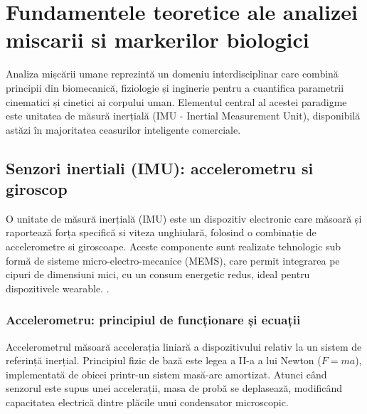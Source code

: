 \chapter{Fundamentele teoretice ale analizei miscarii si markerilor biologici}

\hspace{0.75cm}Analiza mișcării umane reprezintă un domeniu interdisciplinar care combină principii din biomecanică, 
fiziologie și inginerie pentru a cuantifica parametrii cinematici și cinetici ai corpului uman. 
Elementul central al acestei paradigme este unitatea de măsură inerțială (IMU - Inertial Measurement Unit), 
disponibilă astăzi în majoritatea ceasurilor inteligente comerciale.

\section{Senzori inertiali (IMU): accelerometru si giroscop}

\hspace{0.75cm}O unitate de măsură inerțială (IMU) este un dispozitiv electronic care măsoară și raportează forța specifică si viteza unghiulară, folosind o 
combinație de accelerometre si giroscoape. Aceste componente sunt realizate tehnologic sub formă de sisteme micro-electro-mecanice (MEMS), 
care permit integrarea pe cipuri de dimensiuni mici, 
cu un consum energetic redus, ideal pentru dispozitivele wearable. \cite{woodman_2007}.

\subsection{Accelerometru: principiul de funcționare și ecuații}
\hspace{0.75cm}Accelerometrul măsoară accelerația liniară a dispozitivului relativ la un sistem de referință inerțial. 
Principiul fizic de bază este legea a II-a a lui Newton ($F = ma$), implementată de obicei printr-un sistem masă-arc amortizat. 
Atunci când senzorul este supus unei accelerații, masa de probă se deplasează, modificând capacitatea electrică dintre plăcile unui condensator microscopic.

